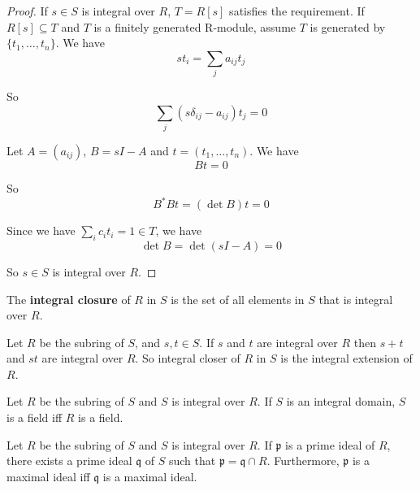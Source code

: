 \documentclass[12pt]{book}
\begin{document}
	\begin{proof}
		If $s\in S$ is integral over $R$, $T=R[s]$ satisfies the requirement. If $R[s]\subseteq T$ and $T$ is a finitely generated R-module, assume $T$ is generated by $\{t_1,\dots,t_n\}$. We have
		\begin{equation}
			st_i=\sum_ja_{ij}t_j
		\end{equation}
		
		So
		\begin{equation}
			\sum_j(s\delta_{ij}-a_{ij})t_j=0
		\end{equation}
		
		Let $A=(a_{ij})$, $B=sI-A$ and $t=(t_1,\dots,t_n)$. We have
		\begin{equation}
			Bt=0
		\end{equation}
		
		So
		\begin{equation}
			B^*Bt=(\det B)t=0
		\end{equation}
		
		Since we have $\sum_i c_it_i=1\in T$, we have 
		\begin{equation}
			\det B=\det(sI-A)=0
		\end{equation}
		
		So $s\in S$ is integral over $R$.
	\end{proof}
	
	\begin{definition}
		The {\bf integral closure} of $R$ in $S$ is the set of all elements in $S$ that is integral over $R$.
	\end{definition}
	
	\begin{lemma}
		Let $R$ be the subring of $S$, and $s,t\in S$. If $s$ and $t$ are integral over $R$ then $s+t$ and $st$ are integral over $R$. So integral closer of $R$ in $S$ is the integral extension of $R$.
	\end{lemma}
	
	\begin{theorem}
		Let $R$ be the subring of $S$ and $S$ is integral over $R$. If $S$ is an integral domain, $S$ is a field iff $R$ is a field.
	\end{theorem}
	
	\begin{theorem}
		Let $R$ be the subring of $S$ and $S$ is integral over $R$. If $\mathfrak p$ is a prime ideal of $R$, there exists a prime ideal $\mathfrak q$ of $S$ such that $\mathfrak p=\mathfrak q\cap R$. Furthermore, $\mathfrak p$ is a maximal ideal iff $\mathfrak q$ is a maximal ideal.
	\end{theorem}
	
\end{document}
